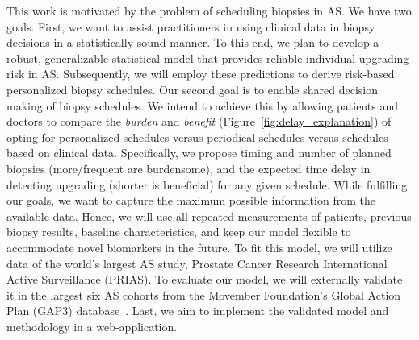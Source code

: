 This work is motivated by the problem of scheduling biopsies in AS. We have two goals. First, we want to assist practitioners in using clinical data in biopsy decisions in a statistically sound manner. To this end, we plan to develop a robust, generalizable statistical model that provides reliable individual upgrading-risk in AS. Subsequently, we will employ these predictions to derive risk-based personalized biopsy schedules. Our second goal is to enable shared decision making of biopsy schedules. We intend to achieve this by allowing patients and doctors to compare the \emph{burden} and \emph{benefit} (Figure~\ref{fig:delay_explanation}) of opting for personalized schedules versus periodical schedules versus schedules based on clinical data. Specifically, we propose timing and number of planned biopsies (more/frequent are burdensome), and the expected time delay in detecting upgrading (shorter is beneficial) for any given schedule. While fulfilling our goals, we want to capture the maximum possible information from the available data. Hence, we will use all repeated measurements of patients, previous biopsy results, baseline characteristics, and keep our model flexible to accommodate novel biomarkers in the future. To fit this model, we will utilize data of the world's largest AS study, Prostate Cancer Research International Active Surveillance (PRIAS). To evaluate our model, we will externally validate it in the largest six AS cohorts from the Movember Foundation's Global Action Plan (GAP3) database~\citep{gap3_2018}. Last, we aim to implement the validated model and methodology in a web-application.